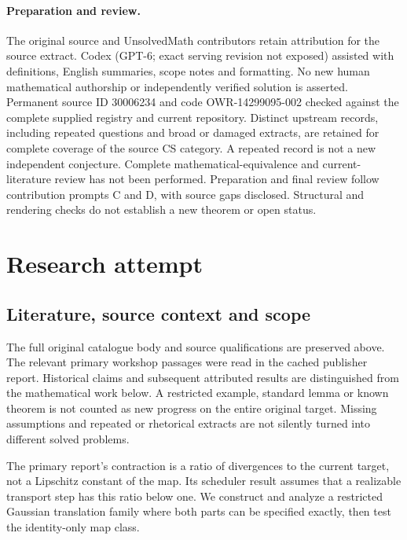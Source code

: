 \documentclass[11pt]{article}
\begin{document}
\paragraph{Preparation and review.}
The original source and UnsolvedMath contributors retain attribution for the source extract. Codex (GPT-6; exact serving revision not exposed) assisted with definitions, English summaries, scope notes and formatting. No new human mathematical authorship or independently verified solution is asserted. Permanent source ID 30006234 and code OWR-14299095-002 checked against the complete supplied registry and current repository. Distinct upstream records, including repeated questions and broad or damaged extracts, are retained for complete coverage of the source CS category. A repeated record is not a new independent conjecture. Complete mathematical-equivalence and current-literature review has not been performed. Preparation and final review follow contribution prompts C and D, with source gaps disclosed. Structural and rendering checks do not establish a new theorem or open status.
\label{end:30006234}

\section{Research attempt}
\subsection{Literature, source context and scope}
The full original catalogue body and source qualifications are preserved above. The relevant primary workshop passages were read in the cached publisher report. Historical claims and subsequent attributed results are distinguished from the mathematical work below. A restricted example, standard lemma or known theorem is not counted as new progress on the entire original target. Missing assumptions and repeated or rhetorical extracts are not silently turned into different solved problems.

The primary report's contraction is a ratio of divergences to the current target, not a Lipschitz constant of the map. Its scheduler result assumes that a realizable transport step has this ratio below one. We construct and analyze a restricted Gaussian translation family where both parts can be specified exactly, then test the identity-only map class.
\end{document}
